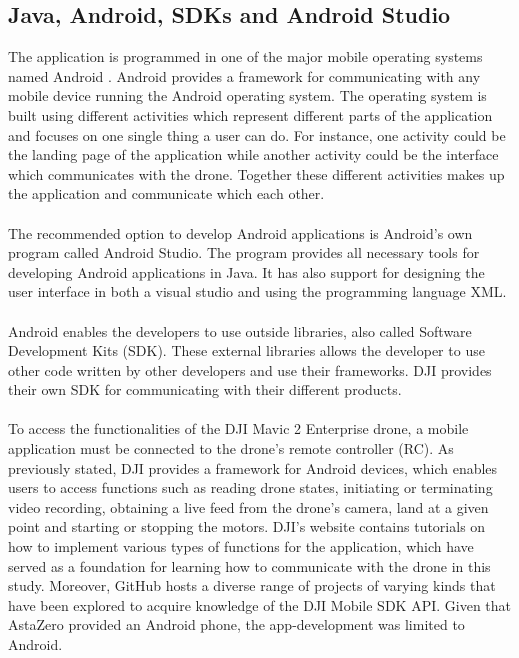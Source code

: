 \subsection{Java, Android, SDKs and Android Studio} \label{Java, Android....}
The application is programmed in one of the major mobile operating systems named Android . Android provides a framework for communicating with any mobile device running the Android operating system. The operating system is built using different activities which represent different parts of the application  and focuses on one single thing a user can do. For instance, one activity could be the landing page of the application while another activity could be the interface which communicates with the drone. Together these different activities makes up the application and communicate which each other.
\\ \\
The recommended option to develop Android applications is Android's own program called Android Studio. The program provides all necessary tools for developing Android applications in Java. It has also support for designing the user interface in both a visual studio and using the programming language XML.
\\ \\
Android enables the developers to use outside libraries, also called Software Development Kits (SDK). These external libraries allows the developer to use other code written by other developers and use their frameworks. DJI provides their own SDK for communicating with their different products.
\\ \\
To access the functionalities of the DJI Mavic 2 Enterprise drone, a mobile application must be connected to the drone's remote controller (RC). As previously stated, DJI provides a framework for Android devices, which enables users to access functions such as reading drone states, initiating or terminating video recording, obtaining a live feed from the drone's camera, land at a given point and starting or stopping the motors. DJI's website contains tutorials on how to implement various types of functions for the application, which have served as a foundation for learning how to communicate with the drone in this study. Moreover, GitHub hosts a diverse range of projects of varying kinds that have been explored to acquire knowledge of the DJI Mobile SDK API.
Given that AstaZero provided an Android phone, the app-development was limited to Android.



